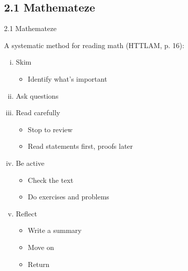 \subsection{2.1 Mathemateze}
\begin{frame}{2.1 Mathemateze}
		
	

A systematic method for reading math (HTTLAM, p. 16):
		
			\begin{enumerate}[(i)]
			
				\item Skim 
				
				\begin{itemize}
				
					\item Identify what's important
				
				\end{itemize}
				
				\item Ask questions
			
				\item Read carefully
				
					\begin{itemize}
					
						\item Stop to review
						
						\item Read statements first, proofs later
											
					\end{itemize}
				
				\item Be active
				
					\begin{itemize}
						
						\item Check the text 

						\item Do exercises and problems
					
					\end{itemize}
				
				\item Reflect
				
					\begin{itemize}
						
						\item Write a summary
						
						\item Move on
						
						\item Return
					
					\end{itemize}
			
			\end{enumerate}
	
		
\end{frame}

